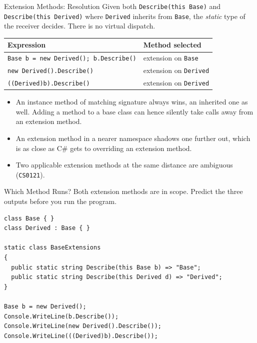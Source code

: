 \begin{frame}{Extension Methods: Resolution}
  Given both \texttt{Describe(this Base)} and \texttt{Describe(this Derived)}
  where \texttt{Derived} inherits from \texttt{Base},
  the \emph{static} type of the receiver decides. There is no virtual dispatch.
  \vspace{1ex}

  \begin{center}
    \footnotesize
    \begin{tabular}{ll}
      \hline
      \textbf{Expression} & \textbf{Method selected}\\
      \hline
      \texttt{Base b = new Derived(); b.Describe()} & extension on \texttt{Base}\\
      \texttt{new Derived().Describe()}             & extension on \texttt{Derived}\\
      \texttt{((Derived)b).Describe()}              & extension on \texttt{Derived}\\
      \hline
    \end{tabular}
  \end{center}
  \vspace{1ex}

  \begin{itemize}
    \item An instance method of matching signature always wins, an inherited one
      as well. Adding a method to a base class can hence silently take calls
      away from an extension method.
    \item An extension method in a nearer namespace shadows one further out,
      which is as close as C\# gets to overriding an extension method.
    \item Two applicable extension methods at the same distance are ambiguous
      (\texttt{CS0121}).
  \end{itemize}
\end{frame}

\begin{exerciseframe}{Which Method Runs?}
  Both extension methods are in scope. Predict the three outputs before you run
  the program.
  \vspace{1ex}

  \begin{lstlisting}[basicstyle=\scriptsize\ttfamily]
class Base { }
class Derived : Base { }

static class BaseExtensions
{
  public static string Describe(this Base b) => "Base";
  public static string Describe(this Derived d) => "Derived";
}

Base b = new Derived();
Console.WriteLine(b.Describe());
Console.WriteLine(new Derived().Describe());
Console.WriteLine(((Derived)b).Describe());
  \end{lstlisting}
\end{exerciseframe}

